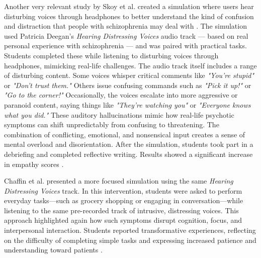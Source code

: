 \vspace{1em}

Another very relevant study by Skoy et al. created a simulation where users hear disturbing voices through headphones to better understand the kind of confusion and distraction that people with schizophrenia may deal with \cite{Skoy2016}. The simulation used Patricia Deegan's \emph{Hearing Distressing Voices} audio track — based on real personal experience with schizophrenia — and was paired with practical tasks. Students completed these while listening to disturbing voices through headphones, mimicking real-life challenges. The audio track itself includes a range of disturbing content. Some voices whisper critical comments like \emph{"You're stupid"} or \emph{"Don't trust them."} Others issue confusing commands such as \emph{"Pick it up!"} or \emph{"Go to the corner!"} Occasionally, the voices escalate into more aggressive or paranoid content, saying things like \emph{"They’re watching you"} or \emph{"Everyone knows what you did."} These auditory hallucinations mimic how real-life psychotic symptoms can shift unpredictably from confusing to threatening. The combination of conflicting, emotional, and nonsensical input creates a sense of mental overload and disorientation. After the simulation, students took part in a debriefing and completed reflective writing. Results showed a significant increase in empathy scores \cite{Skoy2016}.

\vspace{1em}

Chaffin et al. presented a more focused simulation using the same \emph{Hearing Distressing Voices} track. In this intervention, students were asked to perform everyday tasks—such as grocery shopping or engaging in conversation—while listening to the same pre-recorded track of intrusive, distressing voices. This approach highlighted again how such symptoms disrupt cognition, focus, and interpersonal interaction. Students reported transformative experiences, reflecting on the difficulty of completing simple tasks and expressing increased patience and understanding toward patients \cite{Chaffin2013}.

\vspace{1em}

